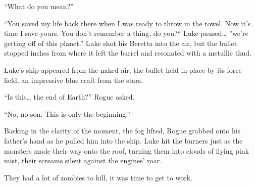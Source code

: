 ``What do you mean?''

``You saved my life back there when I was ready to throw in
the towel. Now it's time I save yours. You don't remember a thing,
do you?`` Luke paused{\ldots} ''we're getting off of this
planet.'' Luke shot his Beretta into the air, but the bullet
stopped inches from where it left the barrel and resonated with a
metallic thud.



Luke's ship appeared from the naked air, the bullet held in
place by its force field, an impressive blue craft from the
stars.



``Is this{\ldots} the end of Earth?'' Rogue asked.

``No, no son. This is only the beginning.''



Basking in the clarity of the moment, the fog lifted, Rogue grab\-bed
onto his father's hand as he pulled him into the ship. Luke
hit the burners just as the monsters made their way onto the roof,
turning them into clouds of flying pink mist, their screams silent
against the engines' roar.



They had a lot of zombies to kill, it was time to get to work. 

 



